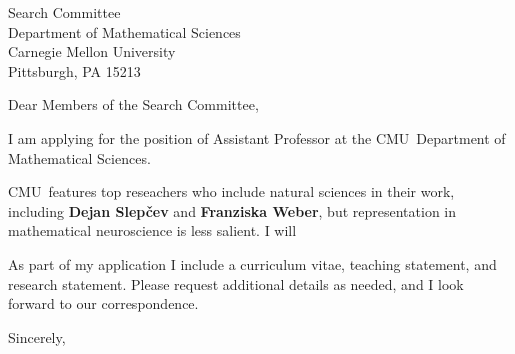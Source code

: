 \documentclass[11pt,a4paper]{letter}
\begin{document}

\def\School{CMU}

\begin{letter}
{Search Committee\\
Department of Mathematical Sciences\\
Carnegie Mellon University\\
Pittsburgh, PA 15213}


\opening{Dear Members of the Search Committee,}

I am applying for the position of Assistant Professor at the \School~Department of Mathematical Sciences. 



\School~features top reseachers who include natural sciences in their work, including \textbf{Dejan Slepčev} and \textbf{Franziska Weber}, but representation in mathematical neuroscience is less salient. I will 



As part of my application I include a curriculum vitae, teaching statement, and research statement. Please request additional details as needed, and I look forward to our correspondence.

\closing{Sincerely,}
\end{letter}
\end{document}
